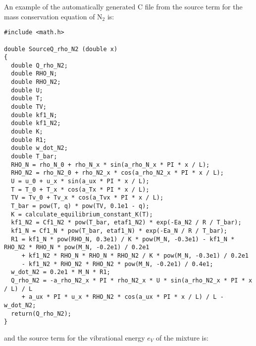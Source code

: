 \documentclass[10pt]{article}
\begin{document}
An example of the automatically generated C file from the source term for the mass conservation equation of N$_2$ is:
\begin{footnotesize}
 \begin{verbatim}
#include <math.h>

double SourceQ_rho_N2 (double x)
{
  double Q_rho_N2;
  double RHO_N;
  double RHO_N2;
  double U;
  double T;
  double TV;
  double kf1_N;
  double kf1_N2;
  double K;
  double R1;
  double w_dot_N2;
  double T_bar;
  RHO_N = rho_N_0 + rho_N_x * sin(a_rho_N_x * PI * x / L);
  RHO_N2 = rho_N2_0 + rho_N2_x * cos(a_rho_N2_x * PI * x / L);
  U = u_0 + u_x * sin(a_ux * PI * x / L);
  T = T_0 + T_x * cos(a_Tx * PI * x / L);
  TV = Tv_0 + Tv_x * cos(a_Tvx * PI * x / L);
  T_bar = pow(T, q) * pow(TV, 0.1e1 - q);
  K = calculate_equilibrium_constant_K(T);
  kf1_N2 = Cf1_N2 * pow(T_bar, etaf1_N2) * exp(-Ea_N2 / R / T_bar);
  kf1_N = Cf1_N * pow(T_bar, etaf1_N) * exp(-Ea_N / R / T_bar);
  R1 = kf1_N * pow(RHO_N, 0.3e1) / K * pow(M_N, -0.3e1) - kf1_N * RHO_N2 * RHO_N * pow(M_N, -0.2e1) / 0.2e1 
     + kf1_N2 * RHO_N * RHO_N * RHO_N2 / K * pow(M_N, -0.3e1) / 0.2e1 
     - kf1_N2 * RHO_N2 * RHO_N2 * pow(M_N, -0.2e1) / 0.4e1;
  w_dot_N2 = 0.2e1 * M_N * R1;
  Q_rho_N2 = -a_rho_N2_x * PI * rho_N2_x * U * sin(a_rho_N2_x * PI * x / L) / L 
     + a_ux * PI * u_x * RHO_N2 * cos(a_ux * PI * x / L) / L - w_dot_N2;
  return(Q_rho_N2);
}
 \end{verbatim}
\end{footnotesize}
%
and the source term for the vibrational energy $e_V$ of the mixture is:
\end{document}

